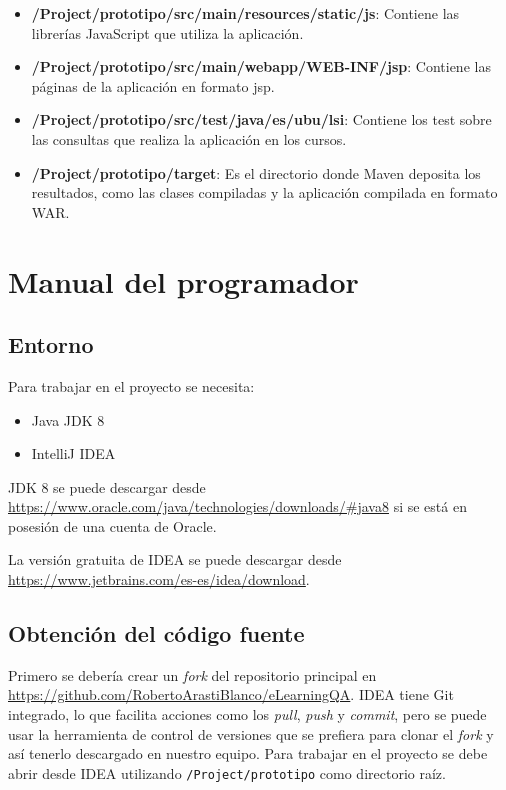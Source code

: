 \begin{itemize}
	\item \textbf{/Project/prototipo/src/main/resources/static/js}: Contiene las librerías JavaScript que utiliza la aplicación.
	\item \textbf{/Project/prototipo/src/main/webapp/WEB-INF/jsp}: Contiene las páginas de la aplicación en formato jsp.
	\item \textbf{/Project/prototipo/src/test/java/es/ubu/lsi}: Contiene los test sobre las consultas que realiza la aplicación en los cursos.
	\item \textbf{/Project/prototipo/target}: Es el directorio donde Maven deposita los resultados, como las clases compiladas y la aplicación compilada en formato WAR.
	
\end{itemize}
\section{Manual del programador}
\subsection{Entorno}
Para trabajar en el proyecto se necesita:
\begin{itemize}
	\item Java JDK 8
	\item IntelliJ IDEA
\end{itemize}

JDK 8 se puede descargar desde \url{https://www.oracle.com/java/technologies/downloads/#java8} si se está en posesión de una cuenta de Oracle.

La versión gratuita de IDEA se puede descargar desde \url{https://www.jetbrains.com/es-es/idea/download}.

\subsection{Obtención del código fuente}
Primero se debería crear un \textit{fork} del repositorio principal en \url{https://github.com/RobertoArastiBlanco/eLearningQA}.
IDEA tiene Git integrado, lo que facilita acciones como los \textit{pull}, \textit{push} y \textit{commit}, pero se puede usar la herramienta de control de versiones que se prefiera para clonar el \textit{fork} y así tenerlo descargado en nuestro equipo.
Para trabajar en el proyecto se debe abrir desde IDEA utilizando \texttt{/Project/prototipo} como directorio raíz.
